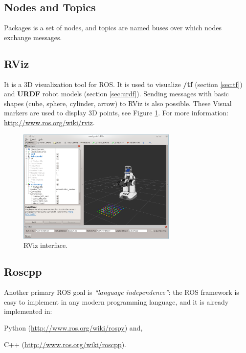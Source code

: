 \subsection{Nodes and Topics}
\label{sec:nodes}
Packages is a set of nodes, and topics are named buses over which nodes exchange messages.

\subsection{RViz}
\label{sec:rviz}

It is a 3D visualization tool for ROS. It is used to visualize \textbf{/tf} (section \ref{sec:tf}) and \textbf{URDF} robot models (section \ref{sec:urdf}). Sending messages with basic shapes (cube, sphere, cylinder, arrow) to RViz is also possible. These Visual markers are used to display 3D points, see Figure \ref{fig:rviz}. For more information: \url{http://www.ros.org/wiki/rviz}.
\begin{figure}[!htbp]
 \centering
 \includegraphics[width=0.7\textwidth]{images/screenshots/rviz.png}
 \caption{RViz interface.}
 \label{fig:rviz}
\end{figure}

\vspace*{-2ex}
\subsection{Roscpp}
\label{sec:roscpp}

Another primary ROS goal is \textit{``language independence''}: the ROS framework is easy to implement in any modern programming language, and it is already implemented in:
\begin{itemize*}
 \item Python (\url{http://www.ros.org/wiki/rospy}) and,
 \item C++ (\url{http://www.ros.org/wiki/roscpp}).
\end{itemize*}

